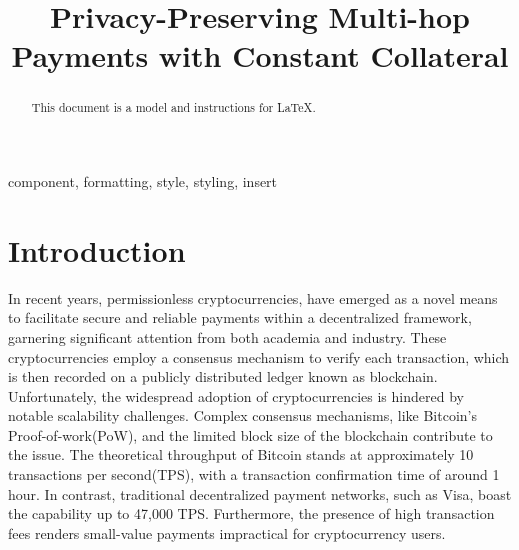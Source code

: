 \documentclass[conference]{IEEEtran}
\begin{document}
\title{Privacy-Preserving Multi-hop Payments with Constant Collateral}

\author{
\and
{}
}

\maketitle

\begin{abstract}
This document is a model and instructions for \LaTeX.
\end{abstract}

\begin{IEEEkeywords}
component, formatting, style, styling, insert
\end{IEEEkeywords}

\section{Introduction}
In recent years, permissionless cryptocurrencies, have emerged as a novel means to facilitate secure
and reliable payments within a decentralized framework, garnering significant attention from both academia 
and industry. These cryptocurrencies employ a consensus mechanism to verify each transaction, which is
then recorded on a publicly distributed ledger known as blockchain. Unfortunately, 
the widespread adoption of cryptocurrencies is hindered by notable scalability challenges. 
Complex consensus mechanisms, like Bitcoin's Proof-of-work(PoW), and the limited block size of the 
blockchain contribute to the issue. The theoretical throughput of Bitcoin stands at approximately 10 transactions 
per second(TPS), with a transaction confirmation time of around 1 hour. In contrast, traditional decentralized 
payment networks, such as Visa, boast the capability up to 47,000 TPS. Furthermore, the presence of high 
transaction fees renders small-value payments impractical for cryptocurrency users. 
\end{document}
